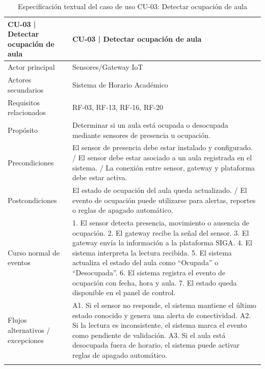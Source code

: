 \begingroup
\small
\begin{longtable}{|p{7.8cm}|p{7.8cm}|}
\hline
CU-03 | Detectar ocupación de aula & CU-03 | Detectar ocupación de aula \\ \hline
Actor principal & Sensores/Gateway IoT \\ \hline
Actores secundarios & Sistema de Horario Académico \\ \hline
Requisitos relacionados & RF-03, RF-13, RF-16, RF-20 \\ \hline
Propósito & Determinar si un aula está ocupada o desocupada mediante sensores de presencia u ocupación. \\ \hline
Precondiciones & El sensor de presencia debe estar instalado y configurado. / El sensor debe estar asociado a un aula registrada en el sistema. / La conexión entre sensor, gateway y plataforma debe estar activa. \\ \hline
Postcondiciones & El estado de ocupación del aula queda actualizado. / El evento de ocupación puede utilizarse para alertas, reportes o reglas de apagado automático. \\ \hline
Curso normal de eventos & 1. El sensor detecta presencia, movimiento o ausencia de ocupación. 2. El gateway recibe la señal del sensor. 3. El gateway envía la información a la plataforma SIGA. 4. El sistema interpreta la lectura recibida. 5. El sistema actualiza el estado del aula como ``Ocupada'' o ``Desocupada''. 6. El sistema registra el evento de ocupación con fecha, hora y aula. 7. El estado queda disponible en el panel de control. \\ \hline
Flujos alternativos / excepciones & A1. Si el sensor no responde, el sistema mantiene el último estado conocido y genera una alerta de conectividad. A2. Si la lectura es inconsistente, el sistema marca el evento como pendiente de validación. A3. Si el aula está desocupada fuera de horario, el sistema puede activar reglas de apagado automático. \\ \hline
\caption{Especificación textual del caso de uso CU-03: Detectar ocupación de aula}
\end{longtable}
\endgroup

